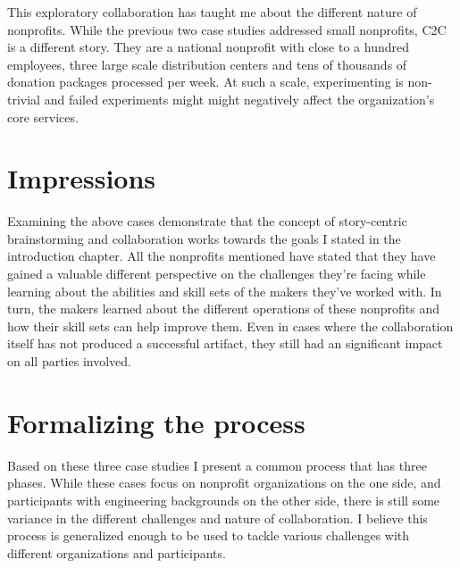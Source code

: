 This exploratory collaboration has taught me about the different nature of nonprofits. While the previous two case studies addressed small nonprofits, C2C is a different story. They are a national nonprofit with close to a hundred employees, three large scale distribution centers and tens of thousands of donation packages processed per week. At such a scale, experimenting is non-trivial and failed experiments might might negatively affect the organization’s core services. 

\section{Impressions}

Examining the above cases demonstrate that the concept of story-centric brainstorming and collaboration works towards the goals I stated in the introduction chapter. All the nonprofits mentioned have stated that they have gained a valuable different perspective on the challenges they're facing while learning about the abilities and skill sets of the makers they've worked with. In turn, the makers learned about the different operations of these nonprofits and how their skill sets can help improve them. Even in cases where the collaboration itself has not produced a successful artifact, they still had an significant impact on all parties involved. 

\section{Formalizing the process}

Based on these three case studies I present a common process that has three phases. While these cases focus on nonprofit organizations on the one side, and participants with engineering backgrounds on the other side, there is still some variance in the different challenges and nature of collaboration. I believe this process is generalized enough to be used to tackle various challenges with different organizations and participants. 

